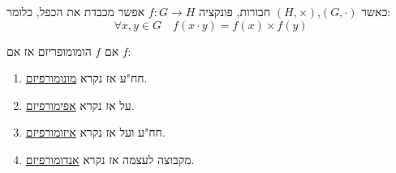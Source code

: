 \documentclass{tstextbook}
\begin{document}
\begin{definition}[הומומורפיזם]
כאשר \(\left( G,\cdot  \right)\),\(\left( H,\times  \right)\) חבורות,
פונקציה \(f:G\to H\) אפשר מכבדת את הכפל, כלומר:
$$\forall x,y\in G\quad f\left(x\cdot y  \right)=f(x)\times f(y)$$

\end{definition}
\begin{definition}
אם \(f\) הומומופריזם אז אם \(f\):

  \begin{enumerate}
    \item חח"ע אז נקרא \underline{מונומורפיזם}. 


    \item על אז נקרא \underline{אפימורפיזם}. 


    \item חח"ע ועל אז נקרא \underline{איזומורפיזם}. 


    \item מקבוצה לעצמה אז נקרא \underline{אנדומורפיזם}. 


  \end{enumerate}
\end{definition}
\end{document}
